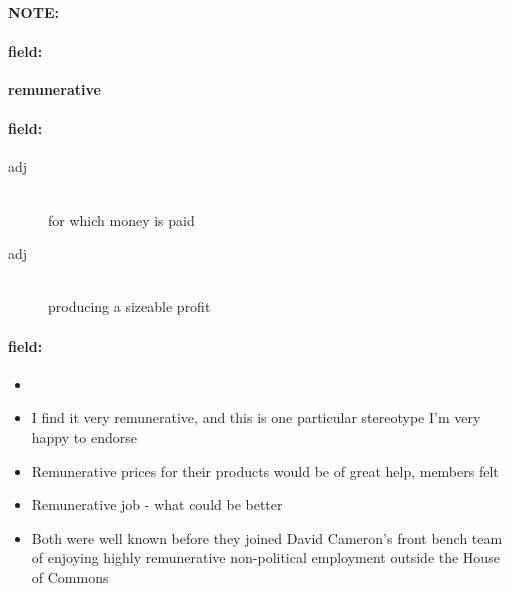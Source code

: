 \documentclass[12pt]{article}
\newenvironment{note}{\paragraph{NOTE:}}{}
\newenvironment{field}{\paragraph{field:}}{}
\begin{document}
\begin{note}
\begin{field}
\textbf{\large remunerative}
\end{field}


\begin{field}
\begin{description}
\item[adj] \hfill \\ 
for which money is paid

\item[adj] \hfill \\ 
producing a sizeable profit

\end{description}
\end{field}

\begin{field}
\begin{itemize}
\item 
\item  I find it very remunerative, and this is one particular stereotype I'm very happy to endorse
\item Remunerative prices for their products would be of great help, members felt
\item Remunerative job - what could be better
\item Both were well known before they joined David Cameron's front bench team of enjoying highly remunerative non-political employment outside the House of Commons
\end{itemize}
\end{field}
\end{note}
\end{document}
